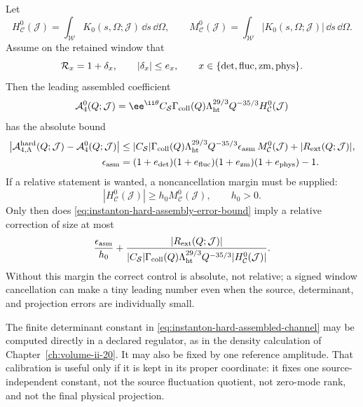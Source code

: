 \begin{controlledapproximation}
\label{ca:instanton-hard-amplitude-assembly-ledger}
Let
\begin{equation}
  H_{\mathcal C}^{0}(\mathcal J)
  =
  \int_{\mathcal W}K_0(s,\Omega;\mathcal J)\,\dd s\,\dd\Omega,
  \qquad
  M_{\mathcal C}^{0}(\mathcal J)
  =
  \int_{\mathcal W}|K_0(s,\Omega;\mathcal J)|\,\dd s\,\dd\Omega .
  \label{eq:instanton-hard-assembly-leading-window}
\end{equation}
Assume on the retained window that
\[
  \mathcal R_x=1+\delta_x,\qquad
  |\delta_x|\le e_x,
  \qquad x\in\{\det,{\rm fluc},{\rm zm},{\rm phys}\}.
\]
Then the leading assembled coefficient
\[
  \mathcal A_{4}^{0}(Q;\mathcal J)
  =
  \ee^{\ii\theta}
  C_{\mathcal S}
  \Gamma_{\rm coll}(Q)
  \Lambda_{\rm ht}^{29/3}Q^{-35/3}
  H_{\mathcal C}^{0}(\mathcal J)
\]
has the absolute bound
\begin{equation}
\begin{aligned}
  \left|
    \mathcal A_{4,\Lambda}^{\rm hard}(Q;\mathcal J)
    -
    \mathcal A_4^0(Q;\mathcal J)
  \right|
  &\le
  |C_{\mathcal S}|\Gamma_{\rm coll}(Q)
  \Lambda_{\rm ht}^{29/3}Q^{-35/3}
  \epsilon_{\rm asm}\,
  M_{\mathcal C}^{0}(\mathcal J)
  +|R_{\rm ext}(Q;\mathcal J)|,                         \\
  \epsilon_{\rm asm}
  &=
  (1+e_{\det})(1+e_{\rm fluc})(1+e_{\rm zm})(1+e_{\rm phys})-1 .
\end{aligned}
  \label{eq:instanton-hard-assembly-error-bound}
\end{equation}
If a relative statement is wanted, a noncancellation margin must be supplied:
\[
  |H_{\mathcal C}^{0}(\mathcal J)|
  \ge h_0 M_{\mathcal C}^{0}(\mathcal J),
  \qquad h_0>0 .
\]
Only then does \eqref{eq:instanton-hard-assembly-error-bound} imply a
relative correction of size at most
\[
  \frac{\epsilon_{\rm asm}}{h_0}
  +
  \frac{|R_{\rm ext}(Q;\mathcal J)|}{
    |C_{\mathcal S}|\Gamma_{\rm coll}(Q)
    \Lambda_{\rm ht}^{29/3}Q^{-35/3}
    |H_{\mathcal C}^{0}(\mathcal J)|
  } .
\]
Without this margin the correct control is absolute, not relative; a signed
window cancellation can make a tiny leading number even when the source,
determinant, and projection errors are individually small.
\end{controlledapproximation}

The finite determinant constant in
\eqref{eq:instanton-hard-assembled-channel} may be computed directly in a
declared regulator, as in the density calculation of
Chapter~\ref{ch:volume-ii-20}.  It may also be fixed by one reference
amplitude.  That calibration is useful only if it is kept in its proper
coordinate: it fixes one source-independent constant, not the source
fluctuation quotient, not zero-mode rank, and not the final physical
projection.

